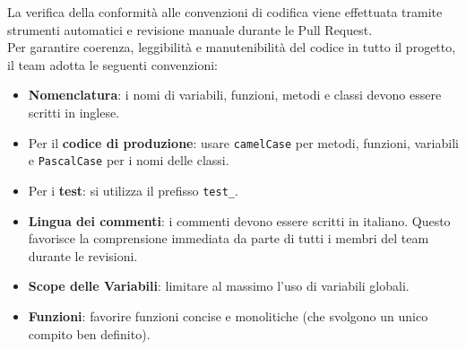 	La verifica della conformità alle convenzioni di codifica viene effettuata tramite strumenti automatici e revisione manuale durante le Pull Request.\\
	Per garantire coerenza, leggibilità e manutenibilità del codice in tutto il progetto, il team adotta le seguenti convenzioni:
	\begin{itemize}[itemsep=3pt, parsep=1pt, label=\textbullet]
		\item \textbf{Nomenclatura}: i nomi di variabili, funzioni, metodi e classi devono essere scritti in inglese.
		\item Per il \textbf{codice di produzione}: usare \texttt{camelCase} per metodi, funzioni, variabili e \texttt{PascalCase} per i nomi delle classi.
        \item Per i \textbf{test}: si utilizza il prefisso \texttt{test\_}.
		\item \textbf{Lingua dei commenti}: i commenti devono essere scritti in italiano. Questo favorisce la comprensione immediata da parte di tutti i membri del team durante le revisioni.
		\item \textbf{Scope delle Variabili}: limitare al massimo l'uso di variabili globali.
		\item \textbf{Funzioni}: favorire funzioni concise e monolitiche (che svolgono un unico compito ben definito).
	\end{itemize}

